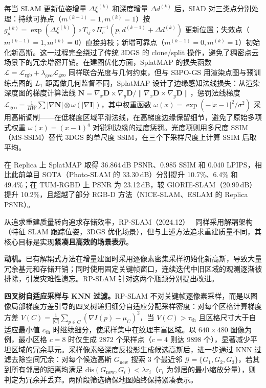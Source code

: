 每当 SLAM 更新位姿增量 $\Delta\xi^{(k)}$ 和深度增量 $\Delta d^{(k)}$ 后，SIAD 对三类点分别处理：持续可靠点（$m^{(k-1)}=1, m^{(k)}=1$）按 $g_p^{(k)} = \exp(\Delta\xi^{(k)})\circ T_{ij}\circ\Pi_c^{-1}(p, d^{(k-1)}+\Delta d^{(k)})$ 更新位置；失效点（$m^{(k-1)}=1, m^{(k)}=0$）直接剪枝；新增可靠点（$m^{(k-1)}=0, m^{(k)}=1$）初始化新高斯。这一过程完全绕过了传统 3DGS 的 clone/split 操作，避免了稠密点云场景下的冗余增密开销。在建图优化方面，SplatMAP 的损失函数 $\mathcal{L} = \mathcal{L}_{\mathrm{rgb}} + \lambda_{\mathrm{geo}}\mathcal{L}_{\mathrm{geo}}$ 同样联合光度与几何约束，但与 S3PO-GS 用渲染点图与预训练点图的 $L_1$ 距离做几何监督不同，SplatMAP 设计了边缘感知法线损失：从渲染深度图的梯度计算法线 $\mathbf{N} = \nabla_x\mathbf{D}\times\nabla_y\mathbf{D}/\|\nabla_x\mathbf{D}\times\nabla_y\mathbf{D}\|$，惩罚法线梯度 $\mathcal{L}_{\mathrm{geo}} = \frac{1}{HW}\sum|\nabla\mathbf{N}|\otimes\omega(|\nabla\mathbf{I}|)$，其中权重函数 $\omega(x) = \exp(-|x-1|^2/\sigma^2)$ 采用高斯调制——在低梯度区域平滑法线，在高梯度边缘保留细节，避免了原始多项式权重 $\omega(x)=(x-1)^q$ 对锐利边缘的过度惩罚。光度项则用多尺度 SSIM（MS-SSIM）替代 3DGS 的单尺度 SSIM，在三个下采样尺度上计算 SSIM 后取平均。

在 Replica 上 SplatMAP 取得 36.864\,dB PSNR、0.985 SSIM 和 0.040 LPIPS，相比此前单目 SOTA（Photo-SLAM 的 33.30\,dB）分别提升 10.7\%、6.4\% 和 49.4\%；在 TUM-RGBD 上 PSNR 为 23.12\,dB，较 GlORIE-SLAM（20.99\,dB）提升 10.2\%，且超越了部分 RGB-D 方法（NICE-SLAM、ESLAM 的 Replica PSNR）。

从追求重建质量转向追求存储效率，RP-SLAM（2024.12）~\cite{2412_09868} 同样采用解耦架构（特征 SLAM 跟踪位姿，3DGS 优化场景），但与上述方法追求重建质量不同，其核心目标是实现\textbf{紧凑且高效的场景表示}。

\textbf{动机。}已有解耦式方法在增量建图时采用逐像素密集采样初始化新高斯，导致大量冗余基元和存储开销；同时使用固定关键帧窗口，连续迭代中旧区域的观测逐渐被排除，引发灾难性遗忘。RP-SLAM 针对这两个瓶颈分别提出改进。

\textbf{四叉树自适应采样与 KNN 过滤。}RP-SLAM 不对关键帧逐像素采样，而是以图像局部梯度方差引导的四叉树递归细分自适应分配采样密度：对每个区格计算梯度方差 $V(C) = \frac{1}{|C|}\sum_{p \in C}(\nabla I(p) - \mu_C)^2$，当 $V(C) > \tau_{\mathrm{th}}$ 且区格尺寸大于自适应最小值 $c_{\mathrm{th}}$ 时继续细分，使采样集中在纹理丰富区域。以 $640 \times 480$ 图像为例，最小区格 $c=8$ 时仅生成 2872 个采样点（$c=4$ 则达 9898 个），显著减少平坦区域的冗余基元。采样像素经深度反投影生成候选高斯后，进一步通过 KNN 过滤去除空间冗余：对每个候选高斯 $G_{\mathrm{new}}$ 搜索 3 个最近邻 $\mathcal{G}=\{G_1, G_2, G_3\}$，若其到所有邻居的距离均满足 $\mathrm{dis}(G_{\mathrm{new}}, G_i) < \lambda r_i$（$r_i$ 为邻居的最小缩放分量），则判定为冗余并丢弃。两阶段筛选确保地图始终保持紧凑表示。

